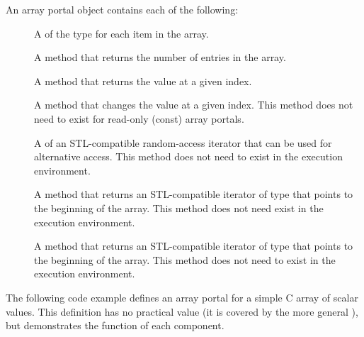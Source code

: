 An array portal object contains each of the following:
\begin{description}
\item[] A  of the type for each item
  in the array.
\item[] A method that returns the number of
  entries in the array.
\item[] A method that returns the value at a given index.
\item[] A method that changes the value at a given
  index. This method does not need to exist for read-only (const) array
  portals.
\item[] A  of an STL-compatible
  random-access iterator that can be used for alternative access. This
  method does not need to exist in the execution environment.
\item[] A method that returns an STL-compatible
  iterator of type  that points to the beginning of
  the array. This method does not need exist in the execution environment.
\item[] A method that returns an STL-compatible
  iterator of type  that points to the beginning of
  the array. This method does not need to exist in the execution
  environment.
\end{description}

The following code example defines an array portal for a simple C array of
scalar values. This definition has no practical value (it is covered by the
more general ), but demonstrates
the function of each component.

